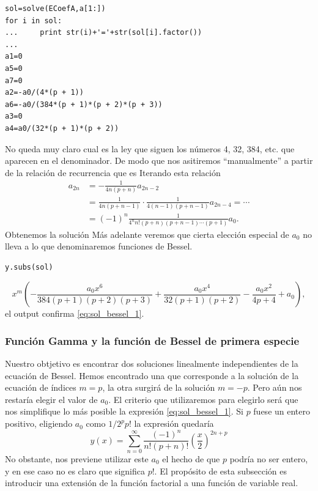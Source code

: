 \begin{lstlisting}
sol=solve(ECoefA,a[1:])
for i in sol:
...     print str(i)+'='+str(sol[i].factor())
...
a1=0
a5=0
a7=0
a2=-a0/(4*(p + 1))
a6=-a0/(384*(p + 1)*(p + 2)*(p + 3))
a3=0
a4=a0/(32*(p + 1)*(p + 2))

\end{lstlisting}
No queda muy claro cual es la ley que siguen los números 4, 32, 384, etc. que aparecen en el denominador. De modo que nos asitiremos ``manualmente'' a partir de la relación de recurrencia que es
Iterando esta relación
\[
\begin{split}
  a_{2n}&=-\frac{1}{4n(p+n)}a_{2n-2}\\
       &=\frac{1}{4n(p+n-1)}\cdot\frac{1}{4(n-1)(p+n-1)}a_{2n-4}=\cdots\\
       & =(-1)^n\frac{1}{4^nn!(p+n)(p+n-1)\cdots (p+1)}a_{0}.
\end{split}
\]
Obtenemos la solución
Más adelante veremos que cierta elección especial de $a_0$ no lleva a lo que denominaremos funciones de Bessel.
\begin{lstlisting}
y.subs(sol)
\end{lstlisting}

\[
x^{m} \left(- \frac{a_{0} x^{6}}{384 \left(p + 1\right) \left(p + 2\right) \left(p + 3\right)} + \frac{a_{0} x^{4}}{32 \left(p + 1\right) \left(p + 2\right)
} - \frac{a_{0} x^{2}}{4 p + 4} + a_{0}\right),
\]
el output confirma \eqref{eq:sol_bessel_1}.

\subsubsection{Función Gamma y la función de Bessel de primera especie}

Nuestro obtjetivo es encontrar dos soluciones linealmente independientes de la ecuación de Bessel. Hemos encontrado una que corresponde a la solución de la ecuación de índices $m=p$, la otra surgirá de la solución $m=-p$. Pero aún nos restaría elegir el valor de $a_0$. El criterio que utilizaremos para elegirlo será que nos simplifique lo más posible la expresión  \eqref{eq:sol_bessel_1}. Si $p$ fuese un entero positivo, eligiendo $a_0$ como $1/2^pp!$ la expresión quedaría
\[y(x)=\sum_{n=0}^{\infty}\frac{(-1)^n}{n!(p+n)!}\left(\frac{x}{2}\right)^{2n+p}\]
No obstante, nos previene utilizar este $a_0$ el hecho de que $p$ podría no ser entero, y en ese caso no es claro que significa $p!$. El propósito de esta subsección es introducir una extensión de la función factorial a una función de variable real.

